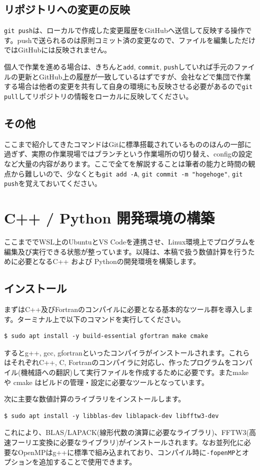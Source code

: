 \documentclass[12pt]{jreport}
\begin{document}
\subsection{リポジトリへの変更の反映}
\texttt{git push}は、ローカルで作成した変更履歴をGitHubへ送信して反映する操作です。pushで送られるのは原則コミット済の変更なので、ファイルを編集しただけではGitHubには反映されません。

個人で作業を進める場合は、きちんと\texttt{add}, \texttt{commit}, \texttt{push}していれば手元のファイルの更新とGitHub上の履歴が一致しているはずですが、会社などで集団で作業する場合は他者の変更を共有して自身の環境にも反映させる必要があるので\texttt{git pull}してリポジトリの情報をローカルに反映してください。

\subsection{その他}
ここまで紹介してきたコマンドはGitに標準搭載されているもののほんの一部に過ぎず、実際の作業現場ではブランチという作業場所の切り替え、configの設定など大量の内容があります。ここで全てを解説することは筆者の能力と時間の観点から難しいので、少なくとも\texttt{git add -A}, \texttt{git commit -m "hogehoge"}, \texttt{git push}を覚えておいてください。

\section{C++ / Python 開発環境の構築}
ここまででWSL上のUbuntuとVS Codeを連携させ、Linux環境上でプログラムを編集及び実行できる状態が整っています。以降は、本稿で扱う数値計算を行うために必要となるC++ および Pythonの開発環境を構築します。

\subsection{インストール}
まずはC++及びFortranのコンパイルに必要となる基本的なツール群を導入します。ターミナル上で以下のコマンドを実行してください。
\begin{lstlisting}[style=terminal]
  $ sudo apt install -y build-essential gfortran make cmake
\end{lstlisting}
するとg++, gcc, gfortranといったコンパイラがインストールされます。これらはそれぞれC++, C, Fortranのコンパイラに対応し、作ったプログラムをコンパイル(機械語への翻訳)して実行ファイルを作成するために必要です。またmake や cmake はビルドの管理・設定に必要なツールとなっています。

次に主要な数値計算のライブラリをインストールします。
\begin{lstlisting}[style=terminal]
  $ sudo apt install -y libblas-dev liblapack-dev libfftw3-dev
\end{lstlisting}
これにより、BLAS/LAPACK(線形代数の演算に必要なライブラリ)、FFTW3(高速フーリエ変換に必要なライブラリ)がインストールされます。なお並列化に必要なOpenMPはg++に標準で組み込まれており、コンパイル時に\texttt{-fopenMP}とオプションを追加することで使用できます。
\end{document}
